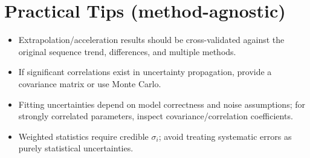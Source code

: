 \documentclass[a4paper,11pt]{article}
\begin{document}
\section{Practical Tips (method-agnostic)}
\begin{itemize}
  \item Extrapolation/acceleration results should be cross-validated against the original sequence trend, differences, and multiple methods.
  \item If significant correlations exist in uncertainty propagation, provide a covariance matrix or use Monte Carlo.
  \item Fitting uncertainties depend on model correctness and noise assumptions; for strongly correlated parameters, inspect covariance/correlation coefficients.
  \item Weighted statistics require credible $\sigma_i$; avoid treating systematic errors as purely statistical uncertainties.
\end{itemize}
\end{document}
